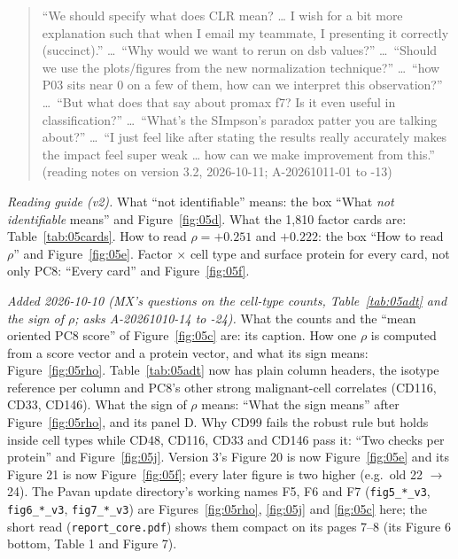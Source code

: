 \begin{quote}
``We should specify what does CLR mean? \ldots{} I wish for a bit more explanation such that when I email my teammate, I presenting it correctly (succinct).'' \ldots\ ``Why would we want to rerun on dsb values?'' \ldots\ ``Should we use the plots/figures from the new normalization technique?'' \ldots\ ``how P03 sits near 0 on a few of them, how can we interpret this observation?'' \ldots\ ``But what does that say about promax f7? Is it even useful in classification?'' \ldots\ ``What's the SImpson's paradox patter you are talking about?'' \ldots\ ``I just feel like after stating the results really accurately makes the impact feel super weak \ldots{} how can we make improvement from this.'' (reading notes on version 3.2, 2026-10-11; A-20261011-01 to -13)
\end{quote}

{\small\color{inkmuted}\emph{Reading guide (v2).} What ``not identifiable'' means: the box ``What \emph{not identifiable} means'' and Figure~\ref{fig:05d}. What the 1,810 factor cards are: Table~\ref{tab:05cards}. How to read $\rho = +0.251$ and $+0.222$: the box ``How to read $\rho$'' and Figure~\ref{fig:05e}. Factor $\times$ cell type and surface protein for every card, not only PC8: ``Every card'' and Figure~\ref{fig:05f}.\par
\emph{Added 2026-10-10 (MX's questions on the cell-type counts, Table~\ref{tab:05adt} and the sign of $\rho$; asks A-20261010-14 to -24).} What the counts and the ``mean oriented PC8 score'' of Figure~\ref{fig:05c} are: its caption. How one $\rho$ is computed from a score vector and a protein vector, and what its sign means: Figure~\ref{fig:05rho}. Table~\ref{tab:05adt} now has plain column headers, the isotype reference per column and PC8's other strong malignant-cell correlates (CD116, CD33, CD146). What the sign of $\rho$ means: ``What the sign means'' after Figure~\ref{fig:05rho}, and its panel D. Why CD99 fails the robust rule but holds inside cell types while CD48, CD116, CD33 and CD146 pass it: ``Two checks per protein'' and Figure~\ref{fig:05j}. Version 3's Figure 20 is now Figure~\ref{fig:05e} and its Figure 21 is now Figure~\ref{fig:05f}; every later figure is two higher (e.g.\ old 22 $\to$ 24). The Pavan update directory's working names F5, F6 and F7 (\texttt{fig5\_*\_v3}, \texttt{fig6\_*\_v3}, \texttt{fig7\_*\_v3}) are Figures~\ref{fig:05rho}, \ref{fig:05j} and \ref{fig:05c} here; the short read (\texttt{report\_core.pdf}) shows them compact on its pages 7--8 (its Figure 6 bottom, Table 1 and Figure 7).\par
}
